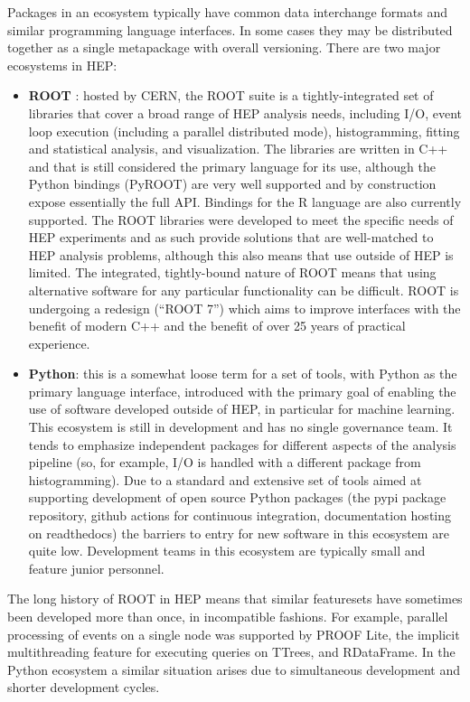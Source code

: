 Packages in an ecosystem typically have common data interchange formats and similar programming language interfaces. In some cases they may be distributed together as a single metapackage with overall versioning. There are two major ecosystems in HEP:
\begin{itemize}
    \item \textbf{ROOT} \cite{Brun:1997pa}: hosted by CERN, the ROOT suite is a tightly-integrated set of libraries that cover a broad range of HEP analysis needs, including I/O, event loop execution (including a parallel distributed mode), histogramming, fitting and statistical analysis, and visualization. The libraries are written in C++ and that is still considered the primary language for its use, although the Python bindings (PyROOT) are very well supported and by construction expose essentially the full API.  Bindings for the R language are also currently supported. The ROOT libraries were developed to meet the specific needs of HEP experiments and as such provide solutions that are well-matched to HEP analysis problems, although this also means that use outside of HEP is limited. The integrated, tightly-bound nature of ROOT means that using alternative software for any particular functionality can be difficult. ROOT is undergoing a redesign \cite{Naumann:2022pub} (``ROOT 7'') which aims to improve interfaces with the benefit of modern C++ and the benefit of over 25 years of practical experience. 
    \item \textbf{Python}: this is a somewhat loose term for a set of tools, with Python as the primary language interface, introduced with the primary goal of enabling the use of software developed outside of HEP, in particular for machine learning. This ecosystem is still in development and has no single governance team. It tends to emphasize independent packages for different aspects of the analysis pipeline (so, for example, I/O is handled with a different package from histogramming). Due to a standard and extensive set of tools aimed at supporting development of open source Python packages (the pypi package repository, github actions for continuous integration, documentation hosting on readthedocs) the barriers to entry for new software in this ecosystem are quite low. Development teams in this ecosystem are typically small and feature junior personnel. 
\end{itemize}

The long history of ROOT in HEP means that similar featuresets have sometimes been developed more than once, in incompatible fashions. For example, parallel processing of events on a single node was supported by PROOF Lite, the implicit multithreading feature for executing queries on TTrees, and RDataFrame. In the Python ecosystem a similar situation arises due to simultaneous development and shorter development cycles.

